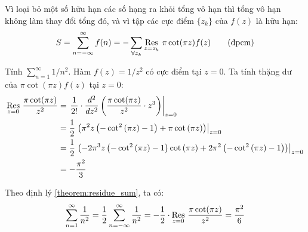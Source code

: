 Vì loại bỏ một số hữu hạn các số hạng ra khỏi tổng vô hạn thì tổng vô hạn không làm thay đổi tổng đó, và vì tập các cực điểm $\{z_k\}$ của $f(z)$ là hữu hạn:
\begin{equation}
	S = \sum_{n=-\infty}^{\infty} f(n) = -\sum_{\forall z_k} \Res{\pi\cot(\pi z)f(z)}{z=z_k} \tag{đpcm}
\end{equation}

\begin{example}
	Tính $\sum_{n=1}^\infty 1/n^2$. Hàm $f(z) = 1/z^2$ có cực điểm tại $z=0$. Ta tính thặng dư của $\pi \cot(\pi z) f(z)$ tại $z=0$:
	\begin{align*}
		\Res{\frac{\pi \cot(\pi z)}{z^2}}{z=0} 
		&= \left.\frac{1}{2!}\cdot\frac{d^2}{dz^2}\left(\frac{\pi \cot(\pi z)}{z^2}\cdot z^3 \right) \right\rvert_{z=0}\\
		&= \frac 1 2 \left.\left(\pi^{2} z \left(- \cot^{2}{\left(\pi z \right)} - 1\right) + \pi \cot{\left(\pi z \right)}
		\right)\right\rvert_{z=0}\\ 
		&= \frac 1 2 \left.\left(- 2 \pi^{3} z \left(- \cot^{2}{\left(\pi z \right)} - 1\right) \cot{\left(\pi z \right)} + 2 \pi^{2} \left(- \cot^{2}{\left(\pi z \right)} - 1\right)\right)\right\rvert_{z=0}\\
		&= - \frac{ \pi^{2}}{3}
	\end{align*}
\end{example}

Theo định lý \ref{theorem:residue_sum}, ta có:
\begin{equation*}
	\sum_{n=1}^\infty \frac 1 {n^2} = \frac{1}{2}\sum_{n=-\infty}^{\infty} \frac{1}{n^2} =-\frac{1}{2}\cdot\Res{\frac{\pi \cot(\pi z)}{z^2}}{z=0}  = \frac{\pi^2}6
\end{equation*}
